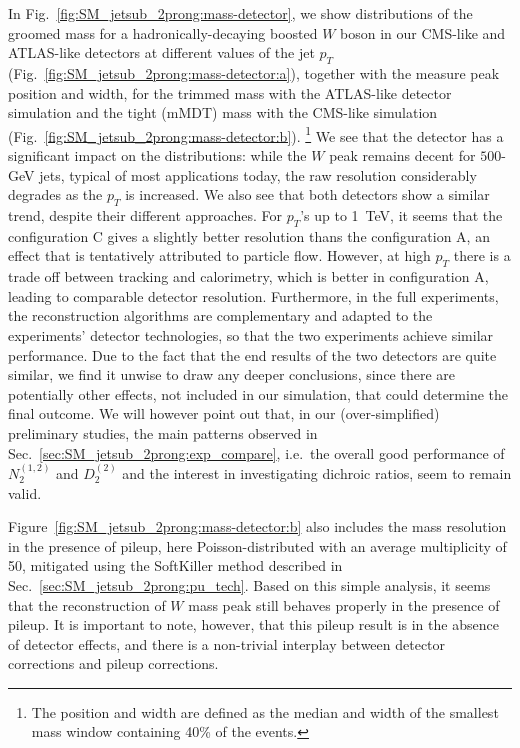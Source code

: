 In Fig.~\ref{fig:SM_jetsub_2prong:mass-detector}, we show distributions
of the groomed mass for a hadronically-decaying boosted $W$ boson in
our CMS-like and ATLAS-like detectors at different values of the jet
$p_T$ (Fig.~\ref{fig:SM_jetsub_2prong:mass-detector:a}), together with
the measure peak position and width, for the trimmed mass with the
ATLAS-like detector simulation and the tight (mMDT) mass with the
CMS-like simulation (Fig.~\ref{fig:SM_jetsub_2prong:mass-detector:b}).%
\footnote{The position and width
  are defined as the median and width of the smallest mass window
  containing 40\% of the events.}
%
We see that the detector has a significant impact on the
distributions: while the $W$ peak remains decent for $500$-GeV jets,
typical of most applications today, the raw resolution considerably
degrades as the $p_T$ is increased.
%
We also see that both detectors show a similar trend, despite their
different approaches.
%
For $p_T$'s up to 1~TeV, it seems that the configuration C gives a
slightly better resolution thans the configuration A, an effect that
is tentatively attributed to particle flow.
%
However, at high $p_T$ there is a trade off between tracking and
calorimetry, which is better in configuration A, leading to comparable detector
resolution.
%
Furthermore, in the full experiments, the reconstruction algorithms
are complementary and adapted to the experiments' detector
technologies, so that the two experiments achieve similar performance.
%
Due to the fact that the end results of the two detectors are quite
similar, we find it unwise to draw any deeper conclusions, since there
are potentially other effects, not included in our simulation, that
could determine the final outcome.
%
We will however point out that, in our (over-simplified) preliminary
studies, the main patterns observed in
Sec.~\ref{sec:SM_jetsub_2prong:exp_compare}, i.e.\ the overall good
performance of $N_2^{(1,2)}$ and $D_2^{(2)}$ and the interest in
investigating dichroic ratios, seem to remain valid.

Figure~\ref{fig:SM_jetsub_2prong:mass-detector:b} also includes the mass
resolution in the presence of pileup, here Poisson-distributed with an
average multiplicity of 50, mitigated using the SoftKiller method
described in Sec.~\ref{sec:SM_jetsub_2prong:pu_tech}.
%
Based on this simple analysis, it
seems that the reconstruction of $W$ mass peak still behaves properly
in the presence of pileup.
%
It is important to note, however, that this pileup result is in the absence of detector effects, and there is a non-trivial interplay between detector corrections and pileup corrections.

